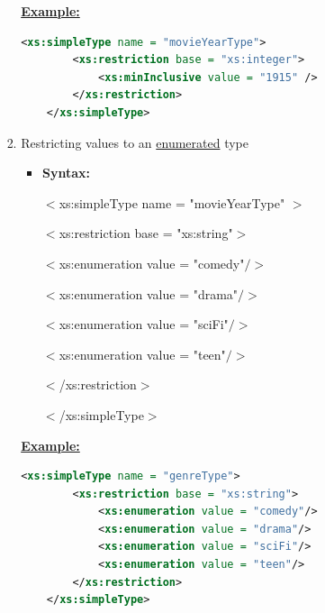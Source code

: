 \documentclass[12pt]{article}
\begin{document}
\begin{enumerate}[1.]
\begin{itemize}
\begin{itemize}
\begin{enumerate}[1.]
                \bigskip

                \underline{\textbf{Example:}}

                \bigskip

    \begin{lstlisting}[language=XML]
    <xs:simpleType name = "movieYearType">
        <xs:restriction base = "xs:integer">
            <xs:minInclusive value = "1915" />
        </xs:restriction>
    </xs:simpleType>
    \end{lstlisting}
                \item Restricting values to an \underline{enumerated} type
                \begin{itemize}
                    \item \textbf{Syntax:}

                    \bigskip

                    $<$xs:simpleType name = "movieYearType" $>$

                    \quad$<$xs:restriction base = "xs:string"$>$

                    \quad\quad$<$xs:enumeration value = "comedy"$/>$

                    \quad\quad$<$xs:enumeration value = "drama"$/>$

                    \quad\quad$<$xs:enumeration value = "sciFi"$/>$

                    \quad\quad$<$xs:enumeration value = "teen"$/>$

                    \quad$<$/xs:restriction$>$

                    $<$/xs:simpleType$>$
                \end{itemize}

                \bigskip

                \underline{\textbf{Example:}}

                \bigskip

    \begin{lstlisting}[language=XML]
    <xs:simpleType name = "genreType">
        <xs:restriction base = "xs:string">
            <xs:enumeration value = "comedy"/>
            <xs:enumeration value = "drama"/>
            <xs:enumeration value = "sciFi"/>
            <xs:enumeration value = "teen"/>
        </xs:restriction>
    </xs:simpleType>
    \end{lstlisting}
            \end{enumerate}
        \end{itemize}


\end{itemize}
\end{enumerate}
\end{document}
